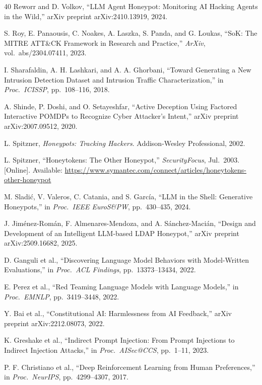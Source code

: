\begin{thebibliography}{40}
 Reworr and D. Volkov, ``LLM Agent Honeypot: Monitoring AI Hacking Agents in the Wild,'' arXiv preprint arXiv:2410.13919, 2024.

 S. Roy, E. Panaousis, C. Noakes, A. Laszka, S. Panda, and G. Loukas, ``SoK: The MITRE ATT\&CK Framework in Research and Practice,'' \emph{ArXiv}, vol.~abs/2304.07411, 2023.

 I. Sharafaldin, A. H. Lashkari, and A. A. Ghorbani, ``Toward Generating a New Intrusion Detection Dataset and Intrusion Traffic Characterization,'' in \emph{Proc.\ ICISSP}, pp.~108--116, 2018.

 A. Shinde, P. Doshi, and O. Setayeshfar, ``Active Deception Using Factored Interactive POMDPs to Recognize Cyber Attacker's Intent,'' arXiv preprint arXiv:2007.09512, 2020.

 L. Spitzner, \emph{Honeypots: Tracking Hackers}. Addison-Wesley Professional, 2002.

 L. Spitzner, ``Honeytokens: The Other Honeypot,'' \emph{SecurityFocus}, Jul.\ 2003. [Online]. Available: \url{https://www.symantec.com/connect/articles/honeytokens-other-honeypot}

 M. Sladi\'c, V. Valeros, C. Catania, and S. Garc\'ia, ``LLM in the Shell: Generative Honeypots,'' in \emph{Proc.\ IEEE EuroS\&PW}, pp.~430--435, 2024.

 J. Jim\'enez-Rom\'an, F. Almenares-Mendoza, and A. S\'anchez-Maci\'an, ``Design and Development of an Intelligent LLM-based LDAP Honeypot,'' arXiv preprint arXiv:2509.16682, 2025.

 D. Ganguli et al., ``Discovering Language Model Behaviors with Model-Written Evaluations,'' in \emph{Proc.\ ACL Findings}, pp.~13373--13434, 2022.

 E. Perez et al., ``Red Teaming Language Models with Language Models,'' in \emph{Proc.\ EMNLP}, pp.~3419--3448, 2022.

 Y. Bai et al., ``Constitutional AI: Harmlessness from AI Feedback,'' arXiv preprint arXiv:2212.08073, 2022.

 K. Greshake et al., ``Indirect Prompt Injection: From Prompt Injections to Indirect Injection Attacks,'' in \emph{Proc.\ AISec@CCS}, pp.~1--11, 2023.

 P. F. Christiano et al., ``Deep Reinforcement Learning from Human Preferences,'' in \emph{Proc.\ NeurIPS}, pp.~4299--4307, 2017.


\end{thebibliography}
